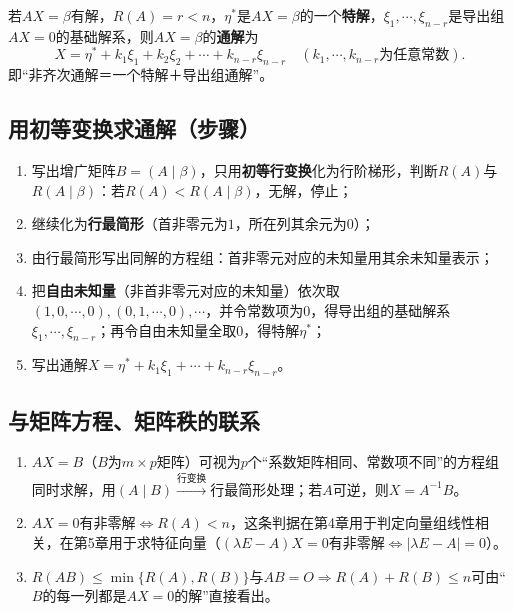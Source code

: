 \begin{corollary}[通解结构]
若$AX=\beta$有解，$R(A)=r<n$，$\eta^{*}$是$AX=\beta$的一个\textbf{特解}，$\xi_1,\cdots,\xi_{n-r}$是导出组$AX=0$的基础解系，则$AX=\beta$的\textbf{通解}为
\[
X=\eta^{*}+k_1\xi_1+k_2\xi_2+\cdots+k_{n-r}\xi_{n-r}\quad(k_1,\cdots,k_{n-r}\text{为任意常数}).
\]
即“非齐次通解＝一个特解＋导出组通解”。
\end{corollary}

\subsection{用初等变换求通解（步骤）}

\begin{enumerate}
\item 写出增广矩阵$B=(A\mid\beta)$，只用\textbf{初等行变换}化为行阶梯形，判断$R(A)$与$R(A\mid\beta)$：若$R(A)<R(A\mid\beta)$，无解，停止；
\item 继续化为\textbf{行最简形}（首非零元为$1$，所在列其余元为$0$）；
\item 由行最简形写出同解的方程组：首非零元对应的未知量用其余未知量表示；
\item 把\textbf{自由未知量}（非首非零元对应的未知量）依次取$(1,0,\cdots,0),(0,1,\cdots,0),\cdots$，并令常数项为$0$，得导出组的基础解系$\xi_1,\cdots,\xi_{n-r}$；再令自由未知量全取$0$，得特解$\eta^*$；
\item 写出通解$X=\eta^*+k_1\xi_1+\cdots+k_{n-r}\xi_{n-r}$。
\end{enumerate}


\subsection{与矩阵方程、矩阵秩的联系}

\begin{enumerate}
\item $AX=B$（$B$为$m\times p$矩阵）可视为$p$个“系数矩阵相同、常数项不同”的方程组同时求解，用$(A\mid B)\xrightarrow{\text{行变换}}$行最简形处理；若$A$可逆，则$X=A^{-1}B$。
\item $AX=0$有非零解$\iff R(A)<n$，这条判据在第4章用于判定向量组线性相关，在第5章用于求特征向量（$(\lambda E-A)X=0$有非零解$\iff|\lambda E-A|=0$）。
\item $R(AB)\le\min\{R(A),R(B)\}$与$AB=O\Rightarrow R(A)+R(B)\le n$可由“$B$的每一列都是$AX=0$的解”直接看出。
\end{enumerate}
